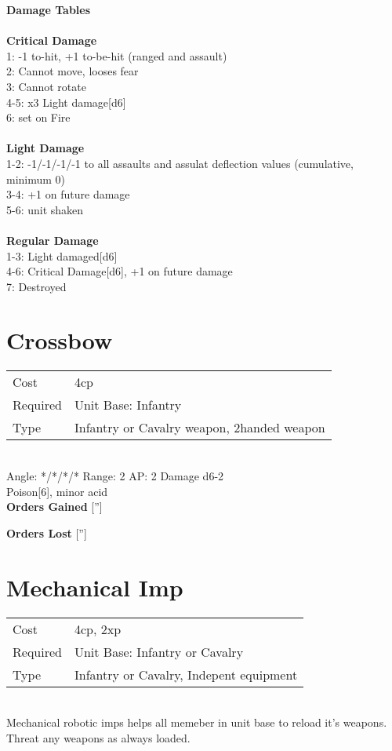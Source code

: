 {\bf Damage Tables} \\
\ \\ {\bf Critical Damage } \\
1: -1 to-hit, +1 to-be-hit (ranged and assault) \\
2: Cannot move, looses fear \\
3: Cannot rotate \\
4-5: x3 Light damage[d6] \\
6: set on Fire \\
\ \\ {\bf Light Damage } \\
1-2: -1/-1/-1/-1 to all assaults and assulat deflection values (cumulative, minimum 0) \\
3-4: +1 on future damage \\
5-6: unit shaken \\
\ \\ {\bf Regular Damage } \\
1-3: Light damaged[d6] \\
4-6: Critical Damage[d6], +1 on future damage \\
7: Destroyed \\









\pagebreak\section{ Crossbow }

\begin{tabular}{ll}
    Cost & 4cp \\
    Required & Unit Base: Infantry\\
    Type & Infantry or Cavalry weapon, 2handed weapon\\
\end{tabular}
\ \\
\indent Angle: */*/*/* Range: 2  AP: 2 Damage d6-2 \\
Poison[6], minor acid
\ \\

{\bf Orders Gained}
['']

{\bf Orders Lost}
['']
\section{ Mechanical Imp }

\begin{tabular}{ll}
    Cost & 4cp, 2xp \\
    Required & Unit Base: Infantry or Cavalry\\
    Type & Infantry or Cavalry, Indepent equipment\\
\end{tabular}
\ \\
Mechanical robotic imps helps all memeber in unit base to reload it's weapons. Threat any weapons as always loaded. \\

